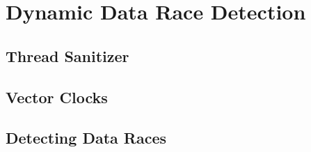 \chapter{Dynamic Data Race Detection}

\section{Thread Sanitizer}

\section{Vector Clocks}

\section{Detecting Data Races}

\unfinished